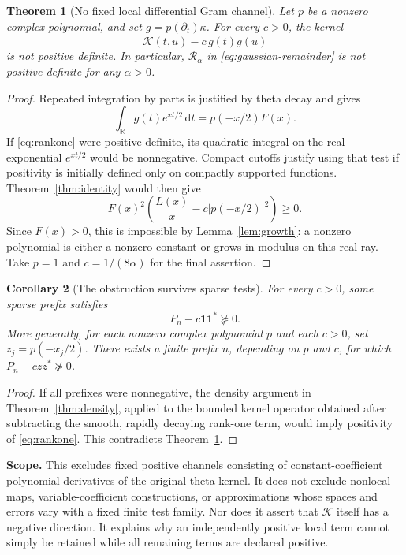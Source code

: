 \documentclass[11pt,letterpaper]{article}
\newtheorem{theorem}{Theorem}[section]
\newtheorem{corollary}[theorem]{Corollary}
\theoremstyle{remark}\newtheorem{remark}[theorem]{Remark}
\newcommand{\R}{\mathbb R}\newcommand{\C}{\mathbb C}
\newcommand{\K}{\mathcal K}\newcommand{\dd}{\,\mathrm d}
\numberwithin{equation}{section}
\begin{document}
\begin{theorem}[No fixed local differential Gram channel]\label{thm:nolocal}
Let $p$ be a nonzero complex polynomial, and set $g=p(\partial_t)\kappa$. For every $c>0$, the kernel
\begin{equation}\label{eq:rankone}
\K(t,u)-c\,g(t)\overline{g(u)}
\end{equation}
is not positive definite. In particular, $\mathcal R_\alpha$ in \eqref{eq:gaussian-remainder} is not positive definite for any $\alpha>0$.
\end{theorem}
\begin{proof}
Repeated integration by parts is justified by theta decay and gives
\[
\int_\R g(t)e^{xt/2}\dd t=p(-x/2)F(x).
\]
If \eqref{eq:rankone} were positive definite, its quadratic integral on the real exponential $e^{xt/2}$ would be nonnegative. Compact cutoffs justify using that test if positivity is initially defined only on compactly supported functions. Theorem~\ref{thm:identity} would then give
\[
F(x)^2\left(\frac{L(x)}x-c|p(-x/2)|^2\right)\ge0.
\]
Since $F(x)>0$, this is impossible by Lemma~\ref{lem:growth}: a nonzero polynomial is either a nonzero constant or grows in modulus on this real ray. Take $p=1$ and $c=1/(8\alpha)$ for the final assertion.
\end{proof}

\begin{corollary}[The obstruction survives sparse tests]
For every $c>0$, some sparse prefix satisfies
\[
P_n-c\mathbf1\mathbf1^*\not\succeq0.
\]
More generally, for each nonzero complex polynomial $p$ and each $c>0$, set $z_j=p(-x_j/2)$. There exists a finite prefix $n$, depending on $p$ and $c$, for which $P_n-czz^*\not\succeq0$.
\end{corollary}
\begin{proof}
If all prefixes were nonnegative, the density argument in Theorem~\ref{thm:density}, applied to the bounded kernel operator obtained after subtracting the smooth, rapidly decaying rank-one term, would imply positivity of \eqref{eq:rankone}. This contradicts Theorem~\ref{thm:nolocal}.
\end{proof}

\textbf{Scope.} This excludes fixed positive channels consisting of constant-coefficient polynomial derivatives of the original theta kernel. It does not exclude nonlocal maps, variable-coefficient constructions, or approximations whose spaces and errors vary with a fixed finite test family. Nor does it assert that $\K$ itself has a negative direction. It explains why an independently positive local term cannot simply be retained while all remaining terms are declared positive.
\end{document}
